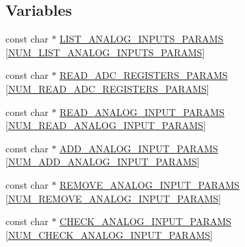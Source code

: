 \subsection*{Variables}
\begin{DoxyCompactItemize}
\item 
const char $\ast$ \hyperlink{group__command__interpreter_ga05294e7317989e4fa34c8b51c703fc70}{L\-I\-S\-T\-\_\-\-A\-N\-A\-L\-O\-G\-\_\-\-I\-N\-P\-U\-T\-S\-\_\-\-P\-A\-R\-A\-M\-S} \mbox{[}\hyperlink{group__command__interpreter_ga89c4eb6445082c988990fe2be2f441b5}{N\-U\-M\-\_\-\-L\-I\-S\-T\-\_\-\-A\-N\-A\-L\-O\-G\-\_\-\-I\-N\-P\-U\-T\-S\-\_\-\-P\-A\-R\-A\-M\-S}\mbox{]}
\item 
const char $\ast$ \hyperlink{group__command__interpreter_gab349c2970503a44eb4e57436974a2bf9}{R\-E\-A\-D\-\_\-\-A\-D\-C\-\_\-\-R\-E\-G\-I\-S\-T\-E\-R\-S\-\_\-\-P\-A\-R\-A\-M\-S} \mbox{[}\hyperlink{group__command__interpreter_gae7b1842582f0a314801b97783767e609}{N\-U\-M\-\_\-\-R\-E\-A\-D\-\_\-\-A\-D\-C\-\_\-\-R\-E\-G\-I\-S\-T\-E\-R\-S\-\_\-\-P\-A\-R\-A\-M\-S}\mbox{]}
\item 
const char $\ast$ \hyperlink{group__command__interpreter_gadb61b1d6d360af240f9a0ef5d83c25cf}{R\-E\-A\-D\-\_\-\-A\-N\-A\-L\-O\-G\-\_\-\-I\-N\-P\-U\-T\-\_\-\-P\-A\-R\-A\-M\-S} \mbox{[}\hyperlink{group__command__interpreter_gac419882cd49159e3078f1fedfe7f1d9d}{N\-U\-M\-\_\-\-R\-E\-A\-D\-\_\-\-A\-N\-A\-L\-O\-G\-\_\-\-I\-N\-P\-U\-T\-\_\-\-P\-A\-R\-A\-M\-S}\mbox{]}
\item 
const char $\ast$ \hyperlink{group__command__interpreter_ga436d10e43feb396c9f5e4d3ef5d510f5}{A\-D\-D\-\_\-\-A\-N\-A\-L\-O\-G\-\_\-\-I\-N\-P\-U\-T\-\_\-\-P\-A\-R\-A\-M\-S} \mbox{[}\hyperlink{group__command__interpreter_gaf0d093bb26c186189433bbd8007cf0c0}{N\-U\-M\-\_\-\-A\-D\-D\-\_\-\-A\-N\-A\-L\-O\-G\-\_\-\-I\-N\-P\-U\-T\-\_\-\-P\-A\-R\-A\-M\-S}\mbox{]}
\item 
const char $\ast$ \hyperlink{group__command__interpreter_ga9bb48c8ce63d89ea1aab20833fbd9691}{R\-E\-M\-O\-V\-E\-\_\-\-A\-N\-A\-L\-O\-G\-\_\-\-I\-N\-P\-U\-T\-\_\-\-P\-A\-R\-A\-M\-S} \mbox{[}\hyperlink{group__command__interpreter_gac7fdbccfbee444562e69bbdc64b3d92d}{N\-U\-M\-\_\-\-R\-E\-M\-O\-V\-E\-\_\-\-A\-N\-A\-L\-O\-G\-\_\-\-I\-N\-P\-U\-T\-\_\-\-P\-A\-R\-A\-M\-S}\mbox{]}
\item 
const char $\ast$ \hyperlink{group__command__interpreter_ga80461ab1e8d28de20ba44ff93e90c174}{C\-H\-E\-C\-K\-\_\-\-A\-N\-A\-L\-O\-G\-\_\-\-I\-N\-P\-U\-T\-\_\-\-P\-A\-R\-A\-M\-S} \mbox{[}\hyperlink{group__command__interpreter_ga06548395b7cce1059cd7eff8f5bfb433}{N\-U\-M\-\_\-\-C\-H\-E\-C\-K\-\_\-\-A\-N\-A\-L\-O\-G\-\_\-\-I\-N\-P\-U\-T\-\_\-\-P\-A\-R\-A\-M\-S}\mbox{]}

\end{DoxyCompactItemize}
